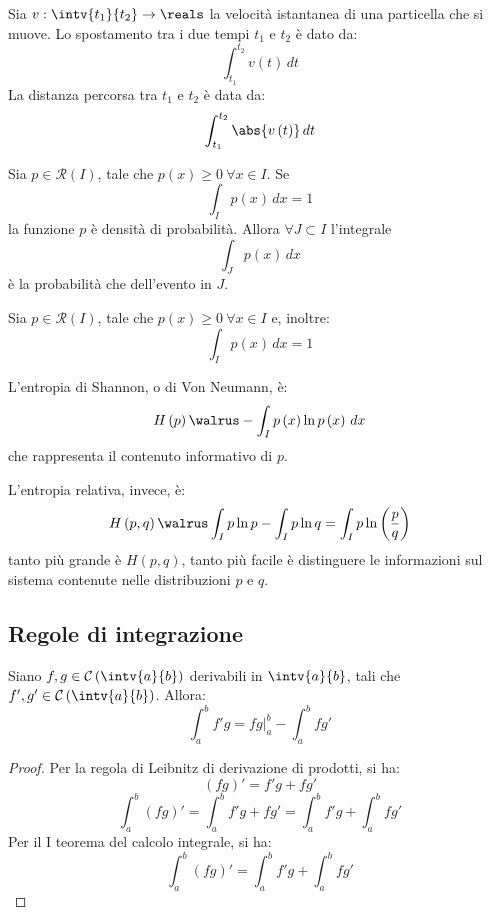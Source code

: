 \begin{example}
  Sia $v:\intv{t_1}{t_2}\to\reals$ la velocità istantanea di una particella che si muove.
  Lo spostamento tra i due tempi $t_1$ e $t_2$ è dato da:
  $$\int_{t_1}^{t_2}v\left( t \right)\,dt$$
  La distanza percorsa tra $t_1$ e $t_2$ è data da:
  $$\int_{t_1}^{t_2}\abs{v\left( t \right)}\,dt$$
\end{example}
\begin{example}
  Sia $p\in\mathcal{R}\left( I \right)$, tale che $p\left( x \right)\ge0\ \forall x\in I$.
  Se $$\int_Ip\left( x \right)\,dx=1$$ la funzione $p$ è densità di probabilità. Allora $\forall J\subset I$ l'integrale
  $$\int_Jp\left( x \right)\,dx$$
  è la probabilità che dell'evento in $J$.
\end{example}
\begin{example}
  Sia $p\in\mathcal{R}\left( I \right)$, tale che $p\left( x \right)\ge0\ \forall x\in I$ e, inoltre:
  $$\int_Ip\left( x \right)\,dx=1$$
  
  L'entropia di Shannon, o di Von Neumann, è:
  $$H\left( p \right)\walrus -\int_Ip\left( x \right)\ln p\left( x \right)\,dx$$
  che rappresenta il contenuto informativo di $p$.
  
  L'entropia relativa, invece, è:
  $$H\left( p,q \right)\walrus \int_Ip\ln p-\int_Ip\ln q=\int_Ip\ln\left( \frac{p}{q} \right)$$
  tanto più grande è $H\left( p,q \right)$, tanto più facile è distinguere le informazioni sul sistema contenute nelle distribuzioni $p$ e $q$.
\end{example}

\subsection{Regole di integrazione}

\begin{theorem}
  Siano $f,g\in\mathcal{C}\left( \intv{a}{b} \right)$ derivabili in $\intv{a}{b}$, tali che $f',g'\in\mathcal{C}\left( \intv{a}{b} \right)$.
  Allora:
  $$\int_a^bf'g=fg\Big|_a^b-\int_a^bfg'$$
\end{theorem}
\begin{proof}
  Per la regola di Leibnitz di derivazione di prodotti, si ha:
  $$\left( fg \right)'=f'g+fg'$$
  $$\int_a^b\left( fg \right)'=\int_a^bf'g+fg'=\int_a^bf'g+\int_a^bfg'$$
  Per il I teorema del calcolo integrale, si ha:
  $$\int_a^b\left( fg \right)'=\int_a^bf'g+\int_a^bfg'$$
\end{proof}

